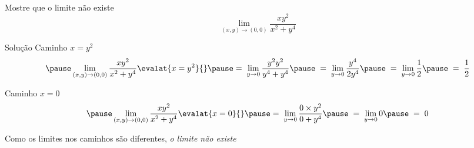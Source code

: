 \begin{question}
  Mostre que o limite não existe
  \[
    \lim_{(x,y) \to (0, 0)} \frac{xy^2}{x^2 + y^4}
  \]
\end{question}

\begin{resolution}{Solução}
  Caminho \(x = y^2\)
  \[
    \pause
    \lim_{(x,y) \to (0,0)} \frac{xy^2}{x^2 + y^4} \evalat{x = y^2}{}
    \pause
    =\; \lim_{y \to 0} \frac{y^2 y^2}{y^4 + y^4}
    \pause
    \;=\; \lim_{y \to 0} \frac{y^4}{2y^4}
    \pause
    \;=\; \lim_{y \to 0} \frac{1}{2}
    \pause
    \;=\; \frac{1}{2}
  \]

  \pause
  Caminho \(x = 0\)
  \[
    \pause
    \lim_{(x,y) \to (0,0)} \frac{xy^2}{x^2 + y^4} \evalat{x = 0}{}
    \pause
    =\; \lim_{y \to 0} \frac{0 \times y^2}{0 + y^4}
    \pause
    \;=\; \lim_{y \to 0} 0
    \pause
    \;=\; 0
  \]

  \pause
  Como os limites nos caminhos são diferentes,
  \pause
  \emph{o limite não existe}
\end{resolution}

